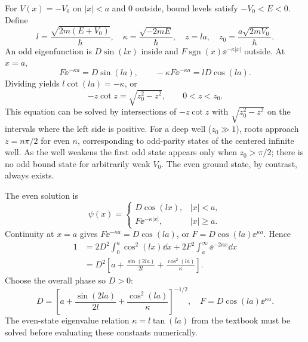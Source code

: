 For $V(x)=-V_0$ on $|x|<a$ and $0$ outside,
bound levels satisfy $-V_0<E<0$. Define
\begin{equation}
l=\frac{\sqrt{2m(E+V_0)}}{\hbar},\quad
\kappa=\frac{\sqrt{-2mE}}{\hbar},\quad
z=la,\quad z_0=\frac{a\sqrt{2mV_0}}{\hbar}.
\end{equation}
An odd eigenfunction is $D\sin(lx)$ inside and
$F\operatorname{sgn}(x)\ee^{-\kappa|x|}$ outside.
At $x=a$,
\begin{equation}
F\ee^{-\kappa a}=D\sin(la),\qquad
-\kappa F\ee^{-\kappa a}=lD\cos(la).
\end{equation}
Dividing yields $l\cot(la)=-\kappa$, or
\begin{equation}
\boxed{-z\cot z=\sqrt{z_0^2-z^2}},\qquad 0<z<z_0.
\end{equation}
This equation can be solved by intersections of
$-z\cot z$ with $\sqrt{z_0^2-z^2}$ on the
intervals where the left side is positive.
For a deep well ($z_0\gg1$), roots approach
$z=n\pi/2$ for even $n$, corresponding to
odd-parity states of the centered infinite well.
As the well weakens the first odd state appears
only when $z_0>\pi/2$; there is no odd bound
state for arbitrarily weak $V_0$.
The even ground state, by contrast, always exists.

The even solution is
\begin{equation}
\psi(x)=
\begin{cases}
D\cos(lx),&|x|<a,\\
F\ee^{-\kappa|x|},&|x|\ge a.
\end{cases}
\end{equation}
Continuity at $x=a$ gives
$F\ee^{-\kappa a}=D\cos(la)$,
or $F=D\cos(la)\ee^{\kappa a}$.
Hence
\begin{align}
1&=2D^2\int_0^a\cos^2(lx)\dd x+
2F^2\int_a^\infty\ee^{-2\kappa x}\dd x\\
&=D^2\left[a+\frac{\sin(2la)}{2l}
+\frac{\cos^2(la)}{\kappa}\right].
\end{align}
Choose the overall phase so $D>0$:
\begin{equation}
\boxed{D=\left[a+\frac{\sin(2la)}{2l}
+\frac{\cos^2(la)}{\kappa}\right]^{-1/2}},
\quad
\boxed{F=D\cos(la)\ee^{\kappa a}}.
\end{equation}
The even-state eigenvalue relation $\kappa=l\tan(la)$
from the textbook must be solved before evaluating
these constants numerically.

